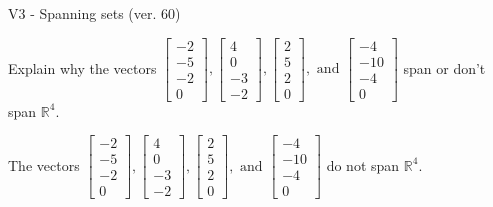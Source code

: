 \begin{exercise}
  \begin{exerciseTitle}V3 - Spanning sets (ver. 60)\end{exerciseTitle}
  \begin{exerciseStatement}
    Explain why the vectors \(\left[\begin{array}{r}
-2 \\
-5 \\
-2 \\
0
\end{array}\right] , \left[\begin{array}{r}
4 \\
0 \\
-3 \\
-2
\end{array}\right] , \left[\begin{array}{r}
2 \\
5 \\
2 \\
0
\end{array}\right] , \text{ and } \left[\begin{array}{r}
-4 \\
-10 \\
-4 \\
0
\end{array}\right]\) span or don't span \(\mathbb{R}^4\). 
	


  \end{exerciseStatement}
  \begin{exerciseAnswer}
   The vectors \(\left[\begin{array}{r}
-2 \\
-5 \\
-2 \\
0
\end{array}\right] , \left[\begin{array}{r}
4 \\
0 \\
-3 \\
-2
\end{array}\right] , \left[\begin{array}{r}
2 \\
5 \\
2 \\
0
\end{array}\right] , \text{ and } \left[\begin{array}{r}
-4 \\
-10 \\
-4 \\
0
\end{array}\right]\) 
  	 do not  
	span \(\mathbb{R}^4\).
  


  \end{exerciseAnswer}
\end{exercise}